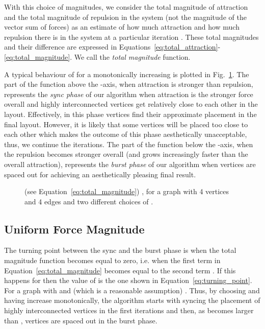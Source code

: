 \documentclass{llncs}
\begin{document}
With this choice of magnitudes, we consider the total magnitude  of attraction and the total magnitude of repulsion  in the system (not the magnitude of the vector sum of forces) as an estimate of how much attraction and how much repulsion there is in the system at a particular iteration . These total magnitudes and their difference  are expressed in Equations~\eqref{eq:total_attraction}-\eqref{eq:total_magnitude}. We call  the \emph{total magnitude} function.







A typical behaviour of  for a monotonically increasing  is plotted in Fig.~\ref{fig:total_magnitude}. The part of the function above the -axis, when attraction is stronger than repulsion, represents the \emph{sync phase} of our algorithm when attraction is the stronger force overall and highly interconnected vertices get relatively close to each other in the layout.  Effectively, in this phase vertices find their approximate placement in the final layout. However, it is likely that some vertices will be placed too close to each other which makes the outcome of this phase aesthetically unacceptable, thus, we continue the iterations. The part of the function below the -axis, when the repulsion becomes stronger overall (and grows increasingly faster than the overall attraction), represents the \emph{burst phase} of our algorithm when vertices are spaced out for achieving an aesthetically pleasing final result.

\begin{figure}
\centering
{}
\caption{ (see Equation~\eqref{eq:total_magnitude}) , for a graph with 4 vertices and 4 edges and two different choices of .}
\label{fig:total_magnitude}
\end{figure}

\subsection{Uniform Force Magnitude} \label{sec:magnitude}

The turning point between the sync and the burst phase is when the total magnitude function  becomes equal to zero, i.e. when the first term  in Equation~\eqref{eq:total_magnitude} becomes equal to the second term . If this happens for  then the value of  is the one shown in Equation~\eqref{eq:turning_point}. For a graph with  and  (which is a reasonable assumption) . Thus, by choosing  and having  increase monotonically, the algorithm starts with syncing the placement of highly interconnected vertices in the first iterations and then, as  becomes larger than , vertices are spaced out in the burst phase.
\end{document}
